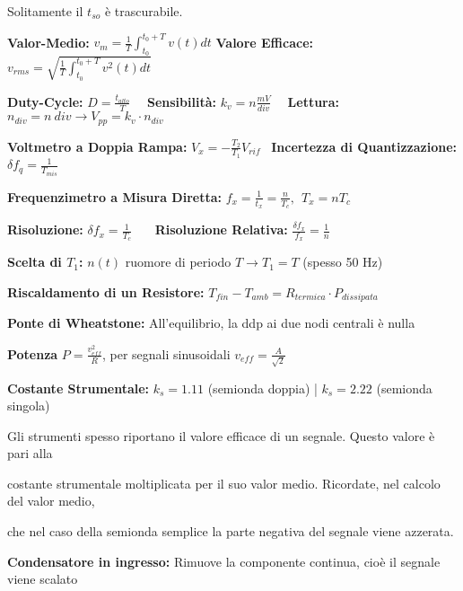 \documentclass[12pt]{extarticle}
\begin{document}
Solitamente il $t_{so}$ è trascurabile.

{\bf Valor-Medio:} $\displaystyle v_m = \frac{1}{T} \int_{t_0}^{t_0+T} v(t)dt $ {\bf Valore Efficace:} $\displaystyle v_{rms}= \sqrt{\frac{1}{T} \int_{t_0}^{t_0+T} v^2(t)dt}$

{\bf Duty-Cycle:} $\displaystyle D = \frac{t_{alto}}{T}$ \ \ {\bf Sensibilità:} $\displaystyle k_v = n\frac{mV}{div}$ \ \ {\bf Lettura:} $\displaystyle n_{div} = n \ div \to  V_{pp} = k_v\cdot n_{div}$

{\bf Voltmetro a Doppia Rampa:} $\displaystyle V_x = -\frac{T_2}{T_1}V_{rif}$ \ {\bf Incertezza di Quantizzazione:} $\delta f_q = \frac{1}{T_{mis}}$


{\bf Frequenzimetro a Misura Diretta:} $\displaystyle f_x = \frac{1}{t_x} = \frac{n}{T_c}, \ \ T_x = nT_c$

{\bf Risoluzione:} $\displaystyle \delta f_x = \frac{1}{T_c}$ \ \ \ {\bf Risoluzione Relativa:} $\displaystyle \frac{\delta f_x}{f_x} = \frac{1}{n}$

{\bf Scelta di $T_1$:} $n(t)$ ruomore di periodo $T \to T_1 = T$ (spesso 50 Hz)

{\bf Riscaldamento di un Resistore:} $\displaystyle T_{fin} - T_{amb} = R_{termica}\cdot P_{dissipata}$

{\bf Ponte di Wheatstone:} All'equilibrio, la ddp ai due nodi centrali è nulla 

{\bf Potenza} $\displaystyle P = \frac{v_{eff}^2}{R} $, per segnali sinusoidali $\displaystyle v_{eff} = \frac{A}{\sqrt{2}}$



{\bf Costante Strumentale:} $\displaystyle k_s = 1.11 $ (semionda doppia) | $\displaystyle k_s = 2.22 $ (semionda singola)

Gli strumenti spesso riportano il valore efficace di un segnale. Questo valore è pari alla

costante strumentale moltiplicata per il suo valor medio. Ricordate, nel calcolo del valor medio, 

che nel caso della semionda semplice la parte negativa del segnale viene azzerata.

{\bf Condensatore in ingresso:} Rimuove la componente continua, cioè il segnale viene scalato 
\end{document}
